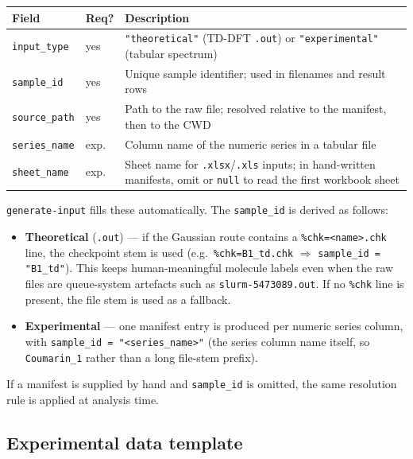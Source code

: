 \documentclass[11pt,a4paper]{article}
\begin{document}
\begin{longtable}{@{}p{2.8cm}p{1.6cm}p{10.15cm}@{}}
\toprule
\textbf{Field} & \textbf{Req?} & \textbf{Description} \\
\midrule
\endhead
\texttt{input\_type}   & yes   & \texttt{"theoretical"} (TD-DFT \texttt{.out}) or \texttt{"experimental"} (tabular spectrum) \\
\texttt{sample\_id}    & yes   & Unique sample identifier; used in filenames and result rows \\
\texttt{source\_path}  & yes   & Path to the raw file; resolved relative to the manifest, then to the CWD \\
\texttt{series\_name}  & exp.  & Column name of the numeric series in a tabular file \\
\texttt{sheet\_name}   & exp.  & Sheet name for \texttt{.xlsx}/\texttt{.xls} inputs; in hand-written manifests, omit or \texttt{null} to read the first workbook sheet \\
\bottomrule
\end{longtable}

\noindent \texttt{generate-input} fills these automatically. The
\texttt{sample\_id} is derived as follows:

\begin{itemize}
  \item \textbf{Theoretical} (\texttt{.out}) --- if the Gaussian route
        contains a \texttt{\%chk=<name>.chk} line, the checkpoint stem
        is used (e.g.\ \texttt{\%chk=B1\_td.chk} \(\Rightarrow\)
        \texttt{sample\_id = "B1\_td"}). This keeps human-meaningful
        molecule labels even when the raw files are queue-system
        artefacts such as \texttt{slurm-5473089.out}. If no
        \texttt{\%chk} line is present, the file stem is used as a
        fallback.
  \item \textbf{Experimental} --- one manifest entry is produced per
        numeric series column, with
        \texttt{sample\_id = "<series\_name>"} (the series column name
        itself, so \texttt{Coumarin\_1} rather than a long file-stem
        prefix).
\end{itemize}

\noindent If a manifest is supplied by hand and \texttt{sample\_id} is
omitted, the same resolution rule is applied at analysis time.

\subsection{Experimental data template}
\end{document}
